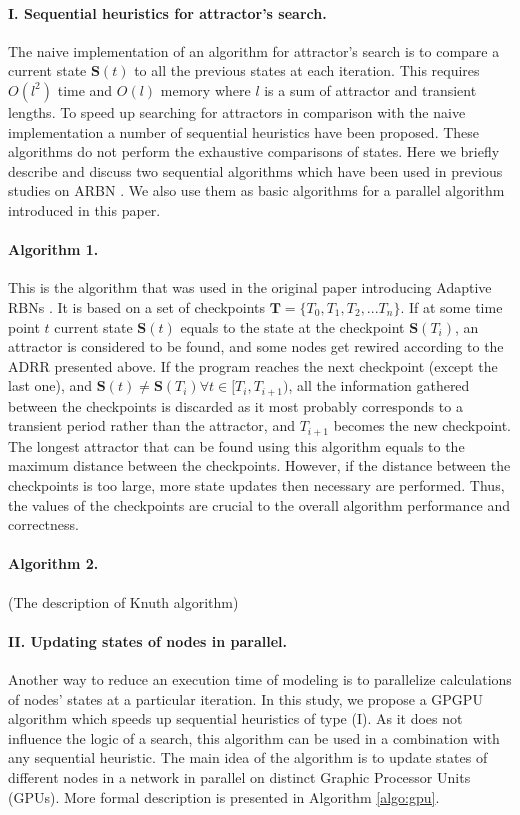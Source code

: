 \documentclass[procedia]{easychair}
\begin{document}
	\paragraph{I. Sequential heuristics for attractor's search.} The naive implementation of an algorithm for attractor's search is to compare a current state $\mathbf{S}(t)$ to all the previous states at each iteration. This requires $O(l^2)$ time and $O(l)$ memory where $l$ is a sum of attractor and transient lengths. 	
	To speed up searching for attractors in comparison with the naive implementation a number of sequential heuristics have been proposed. These algorithms do not perform the exhaustive comparisons of states. Here we briefly describe and discuss two sequential algorithms which have been used in previous studies on ARBN \cite{mlb,Gorski2016}. We also use them as basic algorithms for a parallel algorithm introduced in this paper.
	
	\paragraph{Algorithm 1.} This is the algorithm that was used in the original paper introducing Adaptive RBNs \cite{mlb}.  It is based on a set of checkpoints $\mathbf{T} = \{T_0, T_1, T_2, ... T_n\}$. If at some time point $t$ current state $\mathbf{S}(t)$ equals to the state at the checkpoint $\mathbf{S}(T_i)$, an attractor is considered to be found, and some nodes get rewired according to the ADRR presented above. If the program reaches the next checkpoint (except the last one), and $\mathbf{S}(t) \neq \mathbf{S}(T_i) \forall t \in [T_i, T_{i+1})$, all the information gathered between the checkpoints is discarded as it most probably corresponds to a transient period rather than the attractor, and $T_{i+1}$ becomes the new checkpoint. The longest attractor that can be found using this algorithm equals to the maximum distance between the checkpoints. However, if the distance between the checkpoints is too large, more state updates then necessary are performed. Thus, the values of the checkpoints are crucial to the overall algorithm performance and correctness.
	 
	\paragraph{Algorithm 2.} (The description of Knuth algorithm)

\paragraph{II. Updating states of nodes in parallel.} Another way to reduce an execution time of modeling is to parallelize calculations of nodes' states at a particular iteration. In this study, we propose a GPGPU algorithm which speeds up sequential heuristics of type (I). As it does not influence the logic of a search, this algorithm can be used in a combination with any sequential heuristic. The main idea of the algorithm is to update states of different nodes in a network in parallel on distinct Graphic Processor Units (GPUs). More formal description is presented in Algorithm \ref{algo:gpu}.
\end{document}
